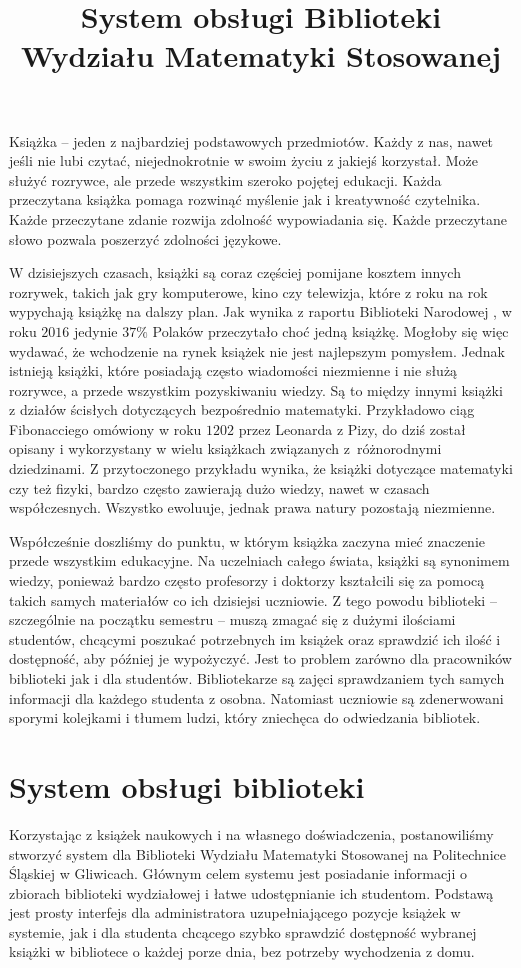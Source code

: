 \documentclass[twoside]{projektInzynierskiMS}
\title{System obsługi Biblioteki Wydziału Matematyki Stosowanej}
\begin{document}
Książka -- jeden z najbardziej podstawowych przedmiotów. Każdy z nas, nawet jeśli nie lubi czytać, niejednokrotnie w swoim życiu z jakiejś korzystał. Może służyć rozrywce, ale przede wszystkim szeroko pojętej edukacji. Każda przeczytana książka pomaga rozwinąć myślenie jak i kreatywność czytelnika. Każde przeczytane zdanie rozwija zdolność wypowiadania się. 
Każde przeczytane słowo pozwala poszerzyć zdolności językowe.

W dzisiejszych czasach, książki są coraz częściej pomijane kosztem innych rozrywek, takich jak gry komputerowe, kino czy telewizja, które z roku na rok wypychają książkę na dalszy plan. Jak wynika z raportu Biblioteki Narodowej \cite{raportBN}, w roku $2016$ jedynie $37\%$ Polaków przeczytało choć jedną książkę. Mogłoby się więc wydawać, że wchodzenie na rynek książek nie jest najlepszym pomysłem. Jednak istnieją książki, które posiadają często wiadomości niezmienne i nie służą rozrywce, a przede wszystkim pozyskiwaniu wiedzy. Są to między innymi książki z działów ścisłych dotyczących bezpośrednio matematyki. Przykładowo ciąg Fibonacciego omówiony w roku $1202$ przez Leonarda z Pizy, do dziś został opisany i wykorzystany w wielu książkach związanych z~różnorodnymi dziedzinami. Z przytoczonego przykładu wynika, że książki dotyczące matematyki czy też fizyki, bardzo często zawierają dużo wiedzy, nawet w czasach współczesnych. Wszystko ewoluuje, jednak prawa natury pozostają niezmienne.

Współcześnie doszliśmy do punktu, w którym książka zaczyna mieć znaczenie przede wszystkim edukacyjne. Na uczelniach całego świata, książki są synonimem wiedzy, ponieważ bardzo często profesorzy i doktorzy kształcili się za pomocą takich samych materiałów co ich dzisiejsi uczniowie. Z tego powodu biblioteki -- szczególnie na początku semestru -- muszą zmagać się z dużymi ilościami studentów, chcącymi poszukać potrzebnych im książek oraz sprawdzić ich ilość i dostępność, aby później je wypożyczyć. Jest to problem zarówno dla pracowników biblioteki jak i dla studentów. Bibliotekarze są zajęci sprawdzaniem tych samych informacji dla każdego studenta z osobna. Natomiast uczniowie są zdenerwowani sporymi kolejkami i tłumem ludzi, który zniechęca do odwiedzania bibliotek.

\section{System obsługi biblioteki}

Korzystając z książek naukowych i na własnego doświadczenia, postanowiliśmy stworzyć system dla Biblioteki Wydziału Matematyki Stosowanej na Politechnice Śląskiej w Gliwicach. Głównym celem systemu jest posiadanie informacji o zbiorach biblioteki wydziałowej i łatwe udostępnianie ich studentom. Podstawą jest prosty interfejs dla administratora uzupełniającego pozycje książek w systemie, jak i dla studenta chcącego szybko sprawdzić dostępność wybranej książki w bibliotece o każdej porze dnia, bez potrzeby wychodzenia z domu.
\end{document}
